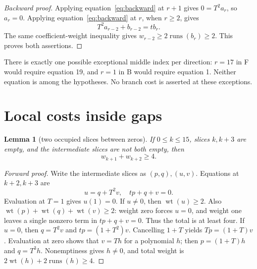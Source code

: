 \documentclass{article}
\newtheorem{lemma}{Lemma}
\DeclareMathOperator{\wt}{wt}
\DeclareMathOperator{\runs}{runs}
\begin{document}
\begin{proof}[Backward proof]
  Applying equation~\eqref{eq:backward} at \(r + 1\) gives \(0 = T^2 a_r\), so \(a_r = 0\).
  Applying equation~\eqref{eq:backward} at \(r\), when \(r \ge 2\), gives
  \begin{equation}
    T^2 a_{r-2} + b_{r-2} = t b_r.
  \end{equation}
  The same coefficient-weight inequality gives \(w_{r-2} \ge 2\runs(b_r) \ge 2\). This
  proves both assertions.
\end{proof}

There is exactly one possible exceptional middle index per direction: \(r = 17\) in F would
require equation 19, and \(r = 1\) in B would require equation 1. Neither equation is among
the hypotheses. No branch cost is asserted at these exceptions.

\section{Local costs inside gaps}\label{sec:gap-costs}

\begin{lemma}[two occupied slices between zeros]\label{lem:two-occupied}
  If \(0 \le k \le 15\), slices \(k, k + 3\) are empty, and the intermediate slices are not
  both empty, then
  \begin{equation}
    w_{k+1} + w_{k+2} \ge 4.
  \end{equation}
\end{lemma}

\begin{proof}[Forward proof]
  Write the intermediate slices as \((p,q), (u,v)\). Equations at \(k + 2, k + 3\) are
  \begin{equation}
    u = q + T^2 v, \quad tp + q + v = 0.
  \end{equation}
  Evaluation at \(T = 1\) gives \(u(1) = 0\). If \(u \ne 0\), then \(\wt(u) \ge 2\). Also
  \(\wt(p) + \wt(q) + \wt(v) \ge 2\): weight zero forces \(u = 0\), and weight one leaves a
  single nonzero term in \(tp + q + v = 0\). Thus the total is at least four. If \(u = 0\),
  then \(q = T^2 v\) and \(tp = (1 + T^2)v\). Cancelling \(1 + T\) yields \(Tp = (1 + T)v\).
  Evaluation at zero shows that \(v = Th\) for a polynomial \(h\); then \(p = (1 + T)h\) and
  \(q = T^3 h\). Nonemptiness gives \(h \ne 0\), and total weight is
  \(2\wt(h) + 2\runs(h) \ge 4\).
\end{proof}
\end{document}
